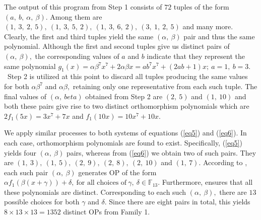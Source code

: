 \documentclass[12pt,a4wide, reqno]{amsart}
\theoremstyle{definition}
\theoremstyle{remark}
\numberwithin{equation}{section}
\begin{document}
The output of this program from Step 1 consists of $72$ tuples of the form $(a,~b,~\alpha,~\beta).$ Among them are $(1,~3,~2,~5),~(1,~3,~5,~2),~(1,~3,~6,~2),~(3,~1,~2,~5)$ and many more. Clearly, the first and third tuples yield the same $(\alpha,~\beta)$ pair and thus the same polynomial. Although the first and second tuples give us distinct pairs of $(\alpha,~\beta),$ the corresponding values of $a$ and $b$  indicate that they represent the same polynomial $g_1(x)=\alpha \beta^7x^7+2\alpha \beta x=ab^7x^7+(2ab+1)x;~a=1,~b=3.$ ~Step 2 is utilized at this point to discard all tuples producing the same values for both $\alpha\beta^7$ and $\alpha\beta,$ retaining only one representative from each such tuple. The final values of $(\alpha,~beta)$ obtained from Step 2 are $(2,~5)$ and $(1,~10)$ and both these pairs give rise to two distinct orthomorphism polynomials which are $2f_1(5x)=3x^7+7x$ and $f_1(10x)=10x^7+10x.$ 

We apply similar processes to both systems of equations (\ref{eq5}) and (\ref{eq6}). In each case, orthomorphism polynomials are found to exist. Specifically, (\ref{eq5}) yields four $(\alpha,~\beta)$ pairs, whereas from (\ref{eq6}) we obtain two of such pairs. They are $(1,~3),~(1,~5),~(2,~9),~(2,~8),~(2,~10)$ and $(1,~7).$ According to , each such pair $(\alpha,~\beta)$ generates OP of the form $\alpha f_1(\beta(x+\gamma))+\delta,~\text{for all choices of}~\gamma,~\delta \in \mathbb{F}_{13}.$ Furthermore,  ensures that all these polynomials are distinct. Corresponding to each such $(\alpha,~\beta),$ there are $13$ possible choices for both $\gamma$ and $\delta.$ Since there are eight pairs in total, this yields $8\times 13\times 13=1352$ distinct OPs from Family 1. 
\end{document}
